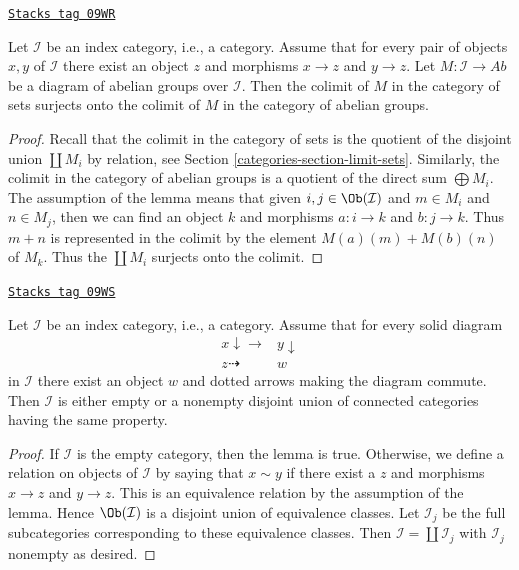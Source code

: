 \begin{lemma}
\label{categories-lemma-colimits-abelian-as-sets}
\href{https://stacks.math.columbia.edu/tag/09WR}{\texttt{Stacks tag 09WR}}

Let $\mathcal{I}$ be an index category, i.e., a category. Assume
that for every pair of objects $x, y$ of $\mathcal{I}$
there exist an object $z$ and morphisms $x \to z$ and $y \to z$.
Let $M : \mathcal{I} \to \textit{Ab}$ be a diagram of abelian
groups over $\mathcal{I}$. Then the colimit of $M$ in the category
of sets surjects onto the colimit of $M$ in the category of
abelian groups.
\end{lemma}

\begin{proof}
Recall that the colimit in the category of sets is the quotient of
the disjoint union $\coprod M_i$ by relation, see
Section \ref{categories-section-limit-sets}.
Similarly, the colimit in the category of abelian groups is a quotient
of the direct sum $\bigoplus M_i$.
The assumption of the lemma means that given $i, j \in \Ob(\mathcal{I})$
and $m \in M_i$ and $n \in M_j$, then we can find an object
$k$ and morphisms $a : i \to k$ and $b : j \to k$.
Thus $m + n$ is represented in the colimit by the element
$M(a)(m) + M(b)(n)$ of $M_k$. Thus the $\coprod M_i$
surjects onto the colimit.
\end{proof}

\begin{lemma}
\label{categories-lemma-split-into-connected}
\href{https://stacks.math.columbia.edu/tag/09WS}{\texttt{Stacks tag 09WS}}

Let $\mathcal{I}$ be an index category, i.e., a category. Assume
that for every solid diagram
$$
\begin{array}{cc}x \downarrow\longrightarrow & y \downarrow \\ z \dashrightarrow & w\end{array}
$$
in $\mathcal{I}$ there exist an object $w$ and dotted arrows
making the diagram commute. Then $\mathcal{I}$ is either empty
or a nonempty disjoint union of connected categories having
the same property.
\end{lemma}

\begin{proof}
If $\mathcal{I}$ is the empty category, then the lemma is true.
Otherwise, we define a relation on objects of $\mathcal{I}$ by
saying that $x \sim y$ if there exist a $z$ and
morphisms $x \to z$ and $y \to z$. This is an equivalence
relation by the assumption of the lemma. Hence $\Ob(\mathcal{I})$
is a disjoint union of equivalence classes. Let $\mathcal{I}_j$
be the full subcategories corresponding to these equivalence classes.
Then $\mathcal{I} = \coprod \mathcal{I}_j$ with $\mathcal{I}_j$
nonempty as desired.
\end{proof}

